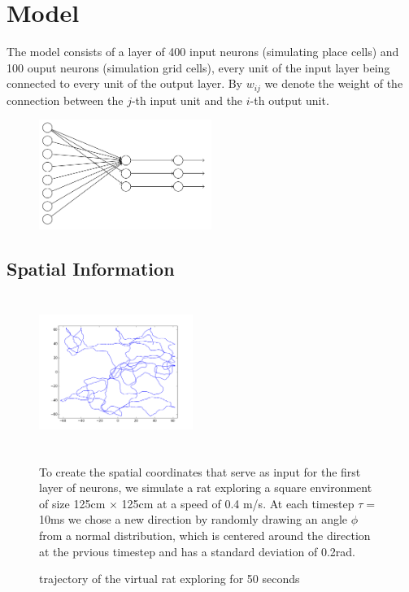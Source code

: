\documentclass[a4paper, 12pt]{article}
\begin{document}
\section{Model}
The model consists of a layer of 400 input neurons (simulating place cells) and 100 ouput neurons (simulation grid cells), every unit of the input layer being connected to every unit of the output layer. By $w_{ij}$ we denote the weight of the connection between the $j$-th input unit and the $i$-th output unit. 
\begin{figure}
\includegraphics[width=0.5\textwidth]{pics/model_overview.png}
\end{figure}
\subsection{Spatial Information}
\begin{figure}[h]
\begin{minipage}{0.5\textwidth}
	\includegraphics[width=5cm, height=5cm]{running_rat.png}
	\caption{\footnotesize{trajectory of the virtual rat exploring for 50 seconds}}
\end{minipage}
\begin{minipage}{0.5\textwidth}
To create the spatial coordinates that serve as input for the first layer of neurons, we simulate a rat exploring a square environment of size 125cm $\times$ 125cm at a speed of 0.4 m/s. At each timestep $\tau=$10ms we chose a new direction by randomly drawing an angle $\phi$ from a normal distribution, which is centered around the direction at the prvious timestep and has a standard deviation of 0.2rad.   
\end{minipage}
\end{figure}
\end{document}
